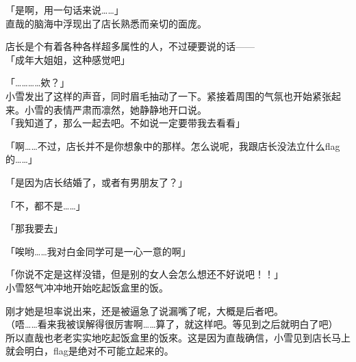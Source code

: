 「是啊，用一句话来说……」\\

直哉的脑海中浮现出了店长熟悉而亲切的面庞。

店长是个有着各种各样超多属性的人，不过硬要说的话——\\

「成年大姐姐，这种感觉吧」

「…………欸？」\\

小雪发出了这样的声音，同时眉毛抽动了一下。紧接着周围的气氛也开始紧张起来。小雪的表情严肃而凛然，她静静地开口说。\\

「我知道了，那么一起去吧。不如说一定要带我去看看」

「啊……不过，店长并不是你想象中的那样。怎么说呢，我跟店长没法立什么flag的……」

「是因为店长结婚了，或者有男朋友了？」

「不，都不是……」

「那我要去」

「唉哟……我对白金同学可是一心一意的啊」

「你说不定是这样没错，但是别的女人会怎么想还不好说吧！！」\\

小雪怒气冲冲地开始吃起饭盒里的饭。

刚才她是坦率说出来，还是被逼急了说漏嘴了呢，大概是后者吧。\\

（唔……看来我被误解得很厉害啊……算了，就这样吧。等见到之后就明白了吧）\\

所以直哉也老老实实地吃起饭盒里的饭來。这是因为直哉确信，小雪见到店长马上就会明白，flag是绝对不可能立起来的。
